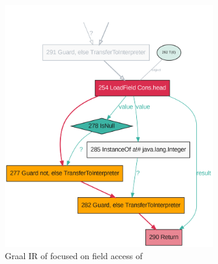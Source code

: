 \begin{figure}[!htb]
	\centering
	\begin{subfigure}[b]{0.4\textwidth}
		\centering
		\includegraphics[width=\textwidth]{figures/dot/List.head.boxed.TruffleTier.png}
		\caption{Graal IR of  focused on field access of }
		\label{graalir:cons-head-boxed}
	\end{subfigure}
	\hfill
	\begin{subfigure}[b]{0.45\textwidth}
		\centering

\end{subfigure}
\end{figure}
